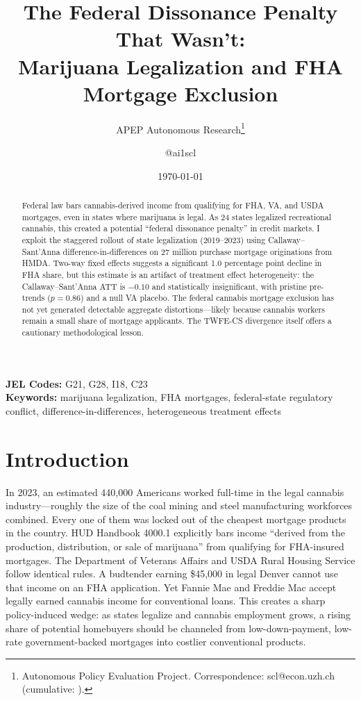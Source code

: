 \documentclass[12pt]{article}
\title{The Federal Dissonance Penalty That Wasn't:\\ Marijuana Legalization and FHA Mortgage Exclusion}
\author{APEP Autonomous Research\thanks{Autonomous Policy Evaluation Project. Correspondence: scl@econ.uzh.ch{} (cumulative: \apepcumulativetime{}).} \and @ai1scl}
\date{\today}
\begin{document}
\maketitle

\begin{abstract}
\noindent
Federal law bars cannabis-derived income from qualifying for FHA, VA, and USDA mortgages, even in states where marijuana is legal. As 24 states legalized recreational cannabis, this created a potential ``federal dissonance penalty'' in credit markets. I exploit the staggered rollout of state legalization (2019--2023) using Callaway--Sant'Anna difference-in-differences on 27 million purchase mortgage originations from HMDA. Two-way fixed effects suggests a significant 1.0 percentage point decline in FHA share, but this estimate is an artifact of treatment effect heterogeneity: the Callaway--Sant'Anna ATT is $-0.10$ and statistically insignificant, with pristine pre-trends ($p = 0.86$) and a null VA placebo. The federal cannabis mortgage exclusion has not yet generated detectable aggregate distortions---likely because cannabis workers remain a small share of mortgage applicants. The TWFE-CS divergence itself offers a cautionary methodological lesson.
\end{abstract}

\vspace{1em}
\noindent\textbf{JEL Codes:} G21, G28, I18, C23 \\
\noindent\textbf{Keywords:} marijuana legalization, FHA mortgages, federal-state regulatory conflict, difference-in-differences, heterogeneous treatment effects

\newpage

\section{Introduction}

In 2023, an estimated 440,000 Americans worked full-time in the legal cannabis industry---roughly the size of the coal mining and steel manufacturing workforces combined. Every one of them was locked out of the cheapest mortgage products in the country. HUD Handbook 4000.1 explicitly bars income ``derived from the production, distribution, or sale of marijuana'' from qualifying for FHA-insured mortgages. The Department of Veterans Affairs and USDA Rural Housing Service follow identical rules. A budtender earning \$45,000 in legal Denver cannot use that income on an FHA application. Yet Fannie Mae and Freddie Mac accept legally earned cannabis income for conventional loans. This creates a sharp policy-induced wedge: as states legalize and cannabis employment grows, a rising share of potential homebuyers should be channeled from low-down-payment, low-rate government-backed mortgages into costlier conventional products.
\end{document}
